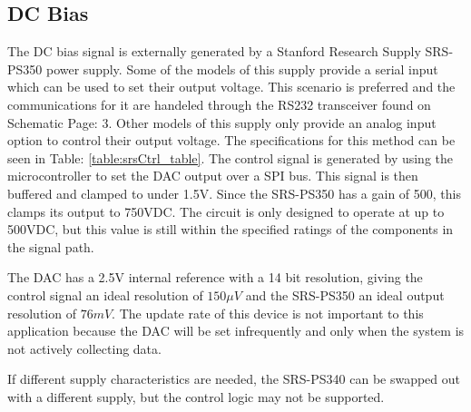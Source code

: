 \subsection {DC Bias}
\label{sec:dcBias}

The DC bias signal is externally generated by a Stanford Research Supply SRS-PS350 power supply. Some of the models of this supply provide a serial input which can be used to set their output voltage. This scenario is preferred and the communications for it are handeled through the RS232 transceiver found on Schematic Page: 3. Other models of this supply only provide an analog input option to control their output voltage. The specifications for this method can be seen in Table: \ref{table:srsCtrl_table}. The control signal is generated by using the microcontroller to set the DAC output over a SPI bus. This signal is then buffered and clamped to under 1.5V. Since the SRS-PS350 has a gain of 500, this clamps its output to 750VDC. The circuit is only designed to operate at up to 500VDC, but this value is still within the specified ratings of the components in the signal path.



The DAC has a 2.5V internal reference with a 14 bit resolution, giving the control signal an ideal resolution of $150\mu V$ and the SRS-PS350 an ideal output resolution of $76mV$. The update rate of this device is not important to this application because the DAC will be set infrequently and only when the system is not actively collecting data.

If different supply characteristics are needed, the SRS-PS340 can be swapped out with a different supply, but the control logic may not be supported.

